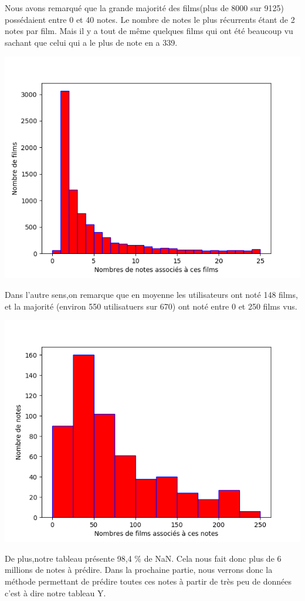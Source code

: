 \documentclass[a4paper,10pt]{article}
\begin{document}
Nous avons remarqué que la grande majorité des films(plus de 8000 sur 9125) possédaient entre 0 et 40 notes. 
Le nombre de notes le plus récurrents étant de 2 notes par film. Mais il y a tout de même quelques films qui ont été
beaucoup vu sachant que celui qui a le plus de note en a 339.

\includegraphics[scale=0.5]{hist2.png}

Dans l’autre sens,on remarque que en moyenne les utilisateurs ont noté 148 films, et la majorité (environ 550 utilisatuers sur 670) ont noté entre 0 et 250 films vus.

\includegraphics[scale=0.5]{hist1.png}


De plus,notre tableau présente 98,4 \% de NaN. Cela nous fait donc plus de 6 millions de notes à prédire. Dans la prochaine partie,
nous verrons donc la méthode permettant de prédire toutes ces notes à partir de très peu de données c'est à dire notre tableau Y.
\end{document}
